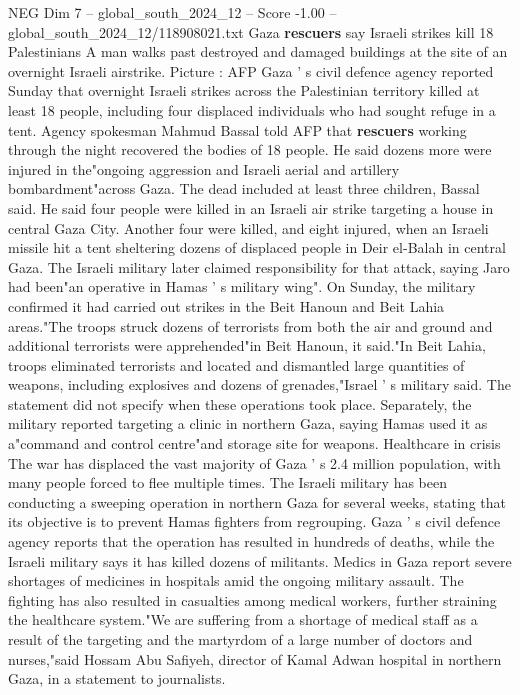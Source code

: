 \begin{textsample}{NEG Dim 7 – global\_south\_2024\_12 – Score -1.00 – global\_south\_2024\_12/118908021.txt}  \label{ex:f7_neg_105}
Gaza \textbf{rescuers} say Israeli strikes kill 18 Palestinians A man walks past destroyed and damaged buildings at the site of an overnight Israeli airstrike.
Picture : AFP Gaza ' s civil defence agency reported Sunday that overnight Israeli strikes across the Palestinian territory killed at least 18 people, including four displaced individuals who had sought refuge in a tent.
Agency spokesman Mahmud Bassal told AFP that \textbf{rescuers} working through the night recovered the bodies of 18 people.
He said dozens more were injured in the"ongoing aggression and Israeli aerial and artillery bombardment"across Gaza.
The dead included at least three children, Bassal said.
He said four people were killed in an Israeli air strike targeting a house in central Gaza City.
Another four were killed, and eight injured, when an Israeli missile hit a tent sheltering dozens of displaced people in Deir el-Balah in central Gaza.
The Israeli military later claimed responsibility for that attack, saying Jaro had been"an operative in Hamas ' s military wing".
On Sunday, the military confirmed it had carried out strikes in the Beit Hanoun and Beit Lahia areas."The troops struck dozens of terrorists from both the air and ground and additional terrorists were apprehended"in Beit Hanoun, it said."In Beit Lahia, troops eliminated terrorists and located and dismantled large quantities of weapons, including explosives and dozens of grenades,"Israel ' s military said.
The statement did not specify when these operations took place.
Separately, the military reported targeting a clinic in northern Gaza, saying Hamas used it as a"command and control centre"and storage site for weapons.
Healthcare in crisis The war has displaced the vast majority of Gaza ' s 2.4 million population, with many people forced to flee multiple times.
The Israeli military has been conducting a sweeping operation in northern Gaza for several weeks, stating that its objective is to prevent Hamas fighters from regrouping.
Gaza ' s civil defence agency reports that the operation has resulted in hundreds of deaths, while the Israeli military says it has killed dozens of militants.
Medics in Gaza report severe shortages of medicines in hospitals amid the ongoing military assault.
The fighting has also resulted in casualties among medical workers, further straining the healthcare system."We are suffering from a shortage of medical staff as a result of the targeting and the martyrdom of a large number of doctors and nurses,"said Hossam Abu Safiyeh, director of Kamal Adwan hospital in northern Gaza, in a statement to journalists.

\end{textsample}
